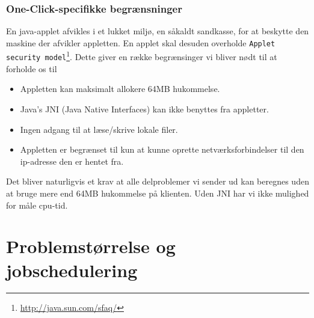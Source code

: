 \documentclass[final,a4paper,11pt]{article}
\newcommand{\oc}{One-Click}
\begin{document}
\subsubsection{\oc-specifikke begrænsninger}\label{begraensninger}
En java-applet afvikles i et lukket miljø, en såkaldt sandkasse, for at beskytte den maskine der afvikler appletten. En applet skal desuden overholde \texttt{Applet security model}\footnote{\url{http://java.sun.com/sfaq/}}. Dette giver en række begrænsinger vi bliver nødt til at forholde os til
\begin{itemize}
	\item Appletten kan maksimalt allokere 64MB hukommelse.
	\item Java's JNI (Java Native Interfaces) kan ikke benyttes fra appletter. 
	\item Ingen adgang til at læse/skrive lokale filer.
	\item Appletten er begrænset til kun at kunne oprette netværksforbindelser til den ip-adresse den er hentet fra.
\end{itemize}

Det bliver naturligvis et krav at alle delproblemer vi sender ud kan beregnes uden at bruge mere end 64MB hukommelse på klienten. Uden JNI har vi ikke mulighed for måle cpu-tid.

\section{Problemstørrelse og jobschedulering}\label{opdelingogschedulering}
\end{document}
